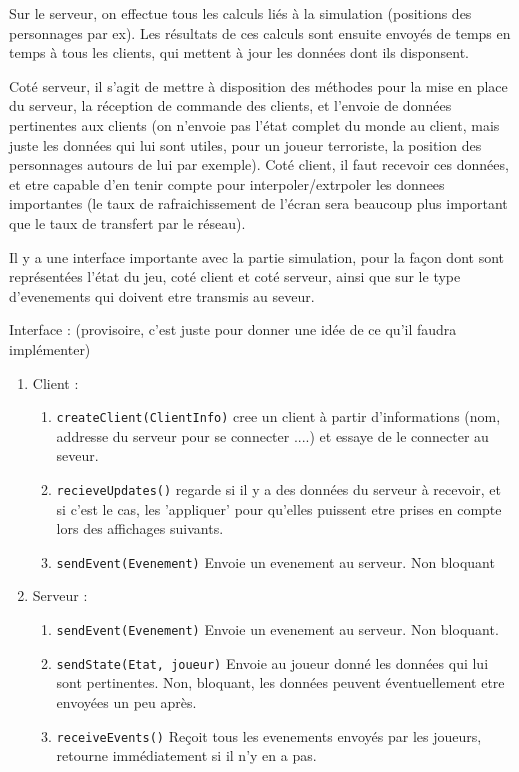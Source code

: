 \documentclass[a4paper,10pt]{article}
\begin{document}
Sur le serveur, on effectue tous les calculs liés à la simulation (positions des personnages par ex). Les résultats de ces calculs sont ensuite envoyés de temps en temps à tous les clients, qui mettent à jour les données dont ils disponsent.

Coté serveur, il s'agit de mettre à disposition des méthodes pour la mise en place du serveur, la réception de commande des clients, et l'envoie de données pertinentes aux clients (on n'envoie pas l'état complet du monde au client, mais juste les données qui lui sont utiles, pour un joueur terroriste, la position des personnages autours de lui par exemple). Coté client, il faut recevoir ces données, et etre capable d'en tenir compte pour interpoler/extrpoler les donnees importantes (le taux de rafraichissement de l'écran sera beaucoup plus important que le taux de transfert par le réseau).

Il y a une interface importante avec la partie simulation, pour la façon dont sont représentées l'état du jeu, coté client et coté serveur, ainsi que sur le type d'evenements qui doivent etre transmis au seveur.

Interface : (provisoire, c'est juste pour donner une idée de ce qu'il faudra implémenter)
\begin{enumerate}
 \item Client : \begin{enumerate}
        \item \verb!createClient(ClientInfo)! cree un client à partir d'informations (nom, addresse du serveur pour se connecter ....) et essaye de le connecter au seveur.
        \item \verb!recieveUpdates()! regarde si il y a des données du serveur à recevoir, et si c'est le cas, les 'appliquer' pour qu'elles puissent etre prises en compte lors des affichages suivants.
        \item \verb!sendEvent(Evenement)! Envoie un evenement au serveur. Non bloquant
       \end{enumerate}
\item Serveur : \begin{enumerate}
                 \item \verb!sendEvent(Evenement)! Envoie un evenement au serveur. Non bloquant.
                 \item \verb!sendState(Etat, joueur)! Envoie au joueur donné les données qui lui sont pertinentes. Non, bloquant, les données peuvent éventuellement etre envoyées un peu après.
                 \item \verb!receiveEvents()! Reçoit tous les evenements envoyés par les joueurs, retourne immédiatement si il n'y en a pas.
                \end{enumerate}

\end{enumerate}
\end{document}
